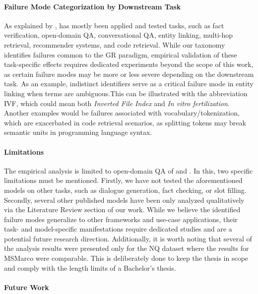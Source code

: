 \paragraph{Failure Mode Categorization by Downstream Task}

As explained by \citet{xiaoxi-li-from-matching},  has mostly been applied and tested  \cite{petroni-kilt-a} tasks, such as fact verification, open-domain QA, conversational QA, entity linking, multi-hop retrieval, recommender systems, and code retrieval. While our taxonomy identifies failures common to the GR paradigm, empirical validation of these task-specific effects requires dedicated experiments beyond the scope of this work, as certain failure modes may be more or less severe depending on the downstream task. As an example, indistinct identifiers serve as a critical failure mode in entity linking when terms are ambiguous.This can be illustrated with the abbreviation IVF, which could mean both \textit{Inverted File Index} and \textit{In vitro fertilization}. Another examples would be failures associated with vocabulary/tokenization, which are exacerbated in code retrieval scenarios, as splitting tokens may break semantic units in programming language syntax.


\paragraph{Limitations}

The empirical analysis is limited to open-domain QA of  and . In this, two specific limitations must be mentioned. Firstly, we have not tested the aforementioned models on other  tasks, such as dialogue generation, fact checking, or slot filling. Secondly, several other published  models have been only analyzed qualitatively via the Literature Review section of our work. While we believe the identified failure modes generalize to other  frameworks and use-case applications, their task- and model-specific manifestations require dedicated studies and are a potential future research direction. Additionally, it is worth noting that several of the analysis results were presented only for the NQ dataset where the results for MSMarco were comparable. This is deliberately done to keep the thesis in scope and comply with the length limits of a Bachelor's thesis.

\paragraph{Future Work}

